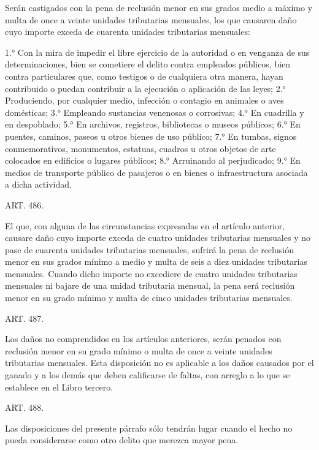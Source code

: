     Serán castigados con la pena de reclusión menor en sus grados medio a máximo y multa de once a veinte unidades tributarias mensuales, los que causaren daño cuyo importe exceda de cuarenta unidades tributarias mensuales:

    1.° Con la mira de impedir el libre ejercicio de la autoridad o en venganza de sus determinaciones, bien se cometiere el delito contra empleados públicos, bien contra particulares que, como testigos o de cualquiera otra manera, hayan contribuido o puedan contribuir a la ejecución o aplicación de las leyes;
    2.° Produciendo, por cualquier medio, infección o contagio en animales o aves domésticas;
    3.° Empleando sustancias venenosas o corrosivas;
    4.° En cuadrilla y en despoblado;
    5.° En archivos, registros, bibliotecas o museos públicos;
    6.° En puentes, caminos, paseos u otros bienes de uso público;
    7.° En tumbas, signos conmemorativos, monumentos, estatuas, cuadros u otros objetos de arte colocados en edificios o lugares públicos;
    8.° Arruinando al perjudicado;
    9.° En medios de transporte público de pasajeros o en bienes o infraestructura asociada a dicha actividad.




    ART. 486.

    El que, con alguna de las circunstancias expresadas en el artículo anterior, causare daño cuyo importe exceda de cuatro unidades tributarias mensuales y no pase de cuarenta unidades tributarias mensuales, sufrirá la pena de reclusión menor en sus grados mínimo a medio y multa de seis a diez unidades tributarias mensuales.
    Cuando dicho importe no excediere de cuatro unidades tributarias mensuales ni bajare de una unidad tributaria mensual, la pena será reclusión menor en su grado mínimo y multa de cinco unidades tributarias mensuales.


    ART. 487.

    Los daños no comprendidos en los artículos anteriores, serán penados con reclusión menor en su grado mínimo o multa de once a veinte unidades tributarias mensuales.
    Esta disposición no es aplicable a los daños causados por el ganado y a los demás que deben calificarse de faltas, con arreglo a lo que se establece en el Libro tercero.






    ART. 488.

    Las disposiciones del presente párrafo sólo tendrán lugar cuando el hecho no pueda considerarse como otro delito que merezca mayor pena.



